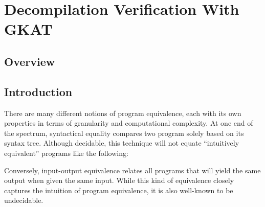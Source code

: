 
\newcommand{\conti}[1]{\mathbf{#1}}
\newcommand{\acc}[1]{{\conti{acc} ~ #1}}  %
\newcommand{\ret}{{\conti{ret}}}  %
\newcommand{\brk}[1]{\conti{brk} ~ #1}  %
\newcommand{\jmp}[1]{{\conti{jmp} ~ #1}} %

\newcommand{\contWith}{\mathbf{cont}}
\newcommand{\exitWith}{\mathbf{exit}}
\newcommand{\iter}{\mathrm{iter}}


\chapter{Decompilation Verification With GKAT}
\label{chapter:Conclusions}
\thispagestyle{myheadings}

\graphicspath{{4_Conclusion/Figures/}}

\section{Overview}


\section{Introduction}

There are many different notions of program equivalence, each with its own properties in terms of granularity and computational complexity.
At one end of the spectrum, syntactical equality compares two program solely based on its syntax tree. Although decidable, this technique will not equate ``intuitively equivalent'' programs like the following:
Conversely, input-output equivalence relates all programs that will yield the same output when given the same input.
While this kind of equivalence closely captures the intuition of program equivalence, it is also well-known to be undecidable.

